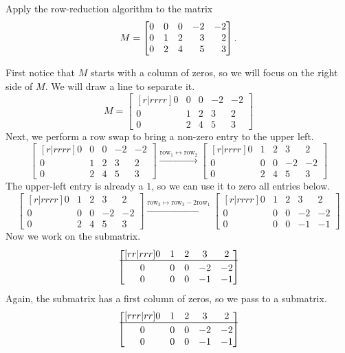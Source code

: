 \begin{example}
	Apply the row-reduction algorithm to the matrix
	\[
		M=\mat{0&0&0&-2&-2\\0&1&2&3&2\\0&2&4&5&3}.
	\]
	
	First notice that $M$ starts with a column of zeros, so we will focus on
	the right side of $M$. We will draw a line to separate it.
	\[
	M=\begin{bmatrix}[r|rrrr]
		0&0&0&-2&-2\\0&1&2&3&2\\0&2&4&5&3
	\end{bmatrix}
	\]
	Next, we perform a row swap to bring a non-zero entry to the upper left.
	\[
	\begin{bmatrix}[r|rrrr]
		0&0&0&-2&-2\\0&1&2&3&2\\0&2&4&5&3
	\end{bmatrix}
	\xrightarrow{\text{row}_1\leftrightarrow\text{row}_2}
	\begin{bmatrix}[r|rrrr]
		0&1&2&3&2\\0&0&0&-2&-2\\0&2&4&5&3
	\end{bmatrix}
	\]
	The upper-left entry is already a $1$, so we can use it to zero all entries below.
	\[
	\begin{bmatrix}[r|rrrr]
		0&1&2&3&2\\0&0&0&-2&-2\\0&2&4&5&3
	\end{bmatrix}
	\xrightarrow{\text{row}_3\mapsto\text{row}_3-2\text{row}_1}
	\begin{bmatrix}[r|rrrr]
		0&1&2&3&2\\0&0&0&-2&-2\\0&0&0&-1&-1
	\end{bmatrix}
	\]
	Now we work on the submatrix.
	\[
	\begin{bmatrix}[rr|rrr]
		0&1&2&3&2\\
		\hline\\[\dimexpr-\normalbaselineskip+2pt]
		0&0&0&-2&-2\\0&0&0&-1&-1
	\end{bmatrix}
	\]
	Again, the submatrix has a first column of zeros, so we pass to a submatrix.
	\[
	\begin{bmatrix}[rrr|rr]
		0&1&2&3&2\\
		\hline\\[\dimexpr-\normalbaselineskip+2pt]
		0&0&0&-2&-2\\0&0&0&-1&-1

\end{bmatrix}\]
\end{example}
